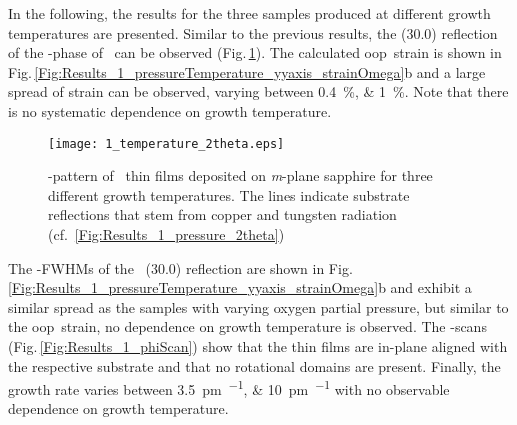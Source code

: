 In the following, the results for the three samples produced at different growth temperatures are presented.
Similar to the previous results, the (30.0) reflection of the \textalpha-phase of \cro\ can be observed (Fig.\,\ref{Fig:Results_1_temperature_2theta}).
The calculated \gls{oop}\ strain is shown in Fig.\,\ref{Fig:Results_1_pressureTemperature_yyaxis_strainOmega}b and a large spread of strain can be observed, varying between \qtylist{0.4;1}{\percent}.
Note that there is no systematic dependence on growth temperature.
\begin{figure}
    \centering
    \texttt{[image: 1\_temperature\_2theta.eps]}
    \caption{
        \thetaomega-pattern of \cro\ thin films deposited on \textit{m}-plane sapphire for three different growth temperatures.
        The lines indicate substrate reflections that stem from copper and tungsten radiation (cf.~\ref{Fig:Results_1_pressure_2theta})
    }
    \label{Fig:Results_1_temperature_2theta}
\end{figure}
The \textomega-FWHMs of the \cro\ (30.0) reflection are shown in Fig.\,\ref{Fig:Results_1_pressureTemperature_yyaxis_strainOmega}b and exhibit a similar spread as the samples with varying oxygen partial pressure, but similar to the \gls{oop}\ strain, no dependence on growth temperature is observed.
The \textphi-scans (Fig.\,\ref{Fig:Results_1_phiScan}) show that the thin films are in-plane aligned with the respective substrate and that no rotational domains are present.
Finally, the growth rate varies between \qtylist{3.5;10}{\pm\per\pulse} with no observable dependence on growth temperature.